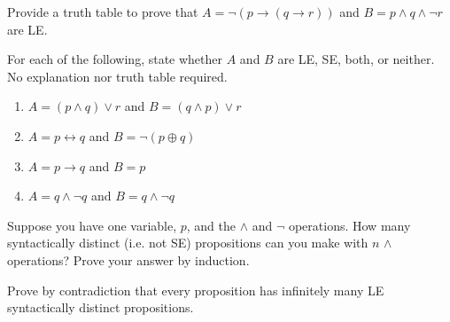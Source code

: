 \documentclass[solution, letterpaper]{cs20}
\begin{document}
\subproblem Provide a truth table to prove that $A  = \neg (p \to (q \to r))$ and $B = p \land q \land \neg r$ are LE.

\subproblem For each of the following, state whether $A$ and $B$ are LE, SE, both, or neither. No explanation nor truth table required.

\begin{enumerate}
\item $A = (p \land q) \lor r$ and $B = (q \land p) \lor r$
\item $A = p \leftrightarrow q$ and $B = \neg (p \oplus q)$
\item $A = p \to q$ and $B = p$
\item $A = q \land \neg q$ and $B = q \land \neg q$
\end{enumerate}

\subproblem Suppose you have one variable, $p$, and the $\land$ and $\neg$ operations. How many syntactically distinct (i.e. not SE) propositions can you make with $n$ $\land$ operations? Prove your answer by induction.

\subproblem Prove by contradiction that every proposition has infinitely many LE syntactically distinct propositions.
\end{document}
